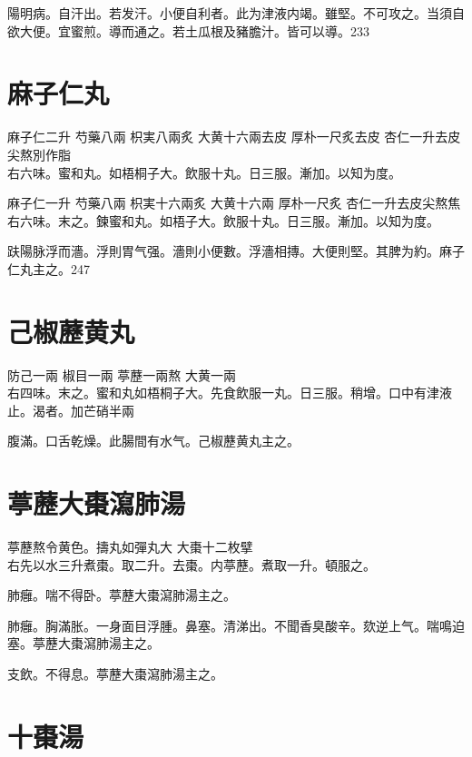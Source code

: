 陽明病。自汗出。若发汗。小便自利者。此为{\khaaitp 津液}内竭。雖堅。不可攻之。当須自欲大便。宜蜜煎。導而通之。若土瓜根及豬膽汁。皆可以導。233

\section{麻子仁丸}

麻子仁{\scriptsize 二升} 芍藥{\scriptsize 八兩} 枳実{\scriptsize 八兩炙} 大黄{\scriptsize 十六兩去皮} 厚朴{\scriptsize 一尺炙去皮} 杏仁{\scriptsize 一升去皮尖熬別作脂}\\
右六味。蜜和丸。如梧桐子大。飲服十丸。日三服。漸加。以知为度。{\zhaoben}

麻子仁{\scriptsize 一升} 芍藥{\scriptsize 八兩} 枳実{\scriptsize 十六兩炙} 大黄{\scriptsize 十六兩} 厚朴{\scriptsize 一尺炙} 杏仁{\scriptsize 一升去皮尖熬焦}\\
右六味。末之。鍊蜜和丸。如梧子大。飲服十丸。日三服。漸加。以知为度。{\wuben}

趺陽脉浮而濇。浮則胃气强。濇則小便數。浮濇相摶。大便則堅。其脾为約。麻子仁丸主之。247

\section{己椒藶黄丸}

防己{\scriptsize 一兩} 椒目{\scriptsize 一兩} 葶藶{\scriptsize 一兩熬} 大黄{\scriptsize 一兩}\\
右四味。末之。蜜和丸如梧桐子大。先食飲服一丸。日三服。稍增。口中有津液止。渴者。加芒硝半兩

腹滿。口舌乾燥。此腸間有水气。己椒藶黄丸主之。

\section{葶藶大棗瀉肺湯}

葶藶{\scriptsize 熬令黄色。擣丸如彈丸大} 大棗{\scriptsize 十二枚擘}\\
右先以水三升煮棗。取二升。去棗。内葶藶。煮取一升。頓服之。

肺癰。喘不得卧。葶藶大棗瀉肺湯主之。

肺癰。胸滿胀。一身面目浮腫。鼻塞。清涕出。不聞香臭酸辛。欬逆上气。喘鳴迫塞。葶藶大棗瀉肺湯主之。

支飲。不得息。葶藶大棗瀉肺湯主之。

\section{十棗湯}


